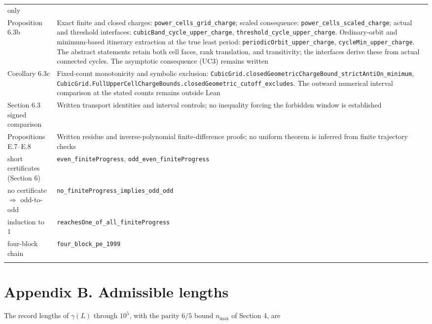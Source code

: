 \documentclass[12pt]{article}
\begin{document}
\begin{longtable}[]{@{}
  >{\raggedright\arraybackslash}p{}
  >{\raggedright\arraybackslash}p{}@{}}
only \\
Proposition 6.3b & Exact finite and closed charges:
\texttt{\nolinkurl{power_cells_grid_charge}}; scaled consequence:
\texttt{\nolinkurl{power_cells_scaled_charge}}; actual and threshold
interfaces: \texttt{\nolinkurl{cubicBand_cycle_upper_charge}},
\texttt{\nolinkurl{threshold_cycle_upper_charge}}. Ordinary-orbit and
minimum-based itinerary extraction at the true least period:
\texttt{\nolinkurl{periodicOrbit_upper_charge}},
\texttt{\nolinkurl{cycleMin_upper_charge}}. The abstract statements
retain both cell faces, rank translation, and transitivity; the
interfaces derive these from actual connected cycles. The asymptotic
consequence (UC3) remains written \\
Corollary 6.3c & Fixed-count monotonicity and symbolic exclusion:
\texttt{\nolinkurl{CubicGrid.closedGeometricChargeBound_strictAntiOn_minimum}},
\texttt{\nolinkurl{CubicGrid.FullUpperCellChargeBounds.closedGeometric_cutoff_excludes}}.
The outward numerical interval comparison at the stated counts remains
outside Lean \\
Section 6.3 signed comparison & Written transport identities and
interval controls; no inequality forcing the forbidden window is
established \\
Propositions E.7--E.8 & Written residue and inverse-polynomial
finite-difference proofs; no uniform theorem is inferred from finite
trajectory checks \\
short certificates (Section 6) &
\texttt{\nolinkurl{even_finiteProgress}},
\texttt{\nolinkurl{odd_even_finiteProgress}} \\
no certificate \(\Rightarrow\) odd-to-odd &
\texttt{\nolinkurl{no_finiteProgress_implies_odd_odd}} \\
induction to \(1\) &
\texttt{\nolinkurl{reachesOne_of_all_finiteProgress}} \\
four-block chain & \texttt{\nolinkurl{four_block_pe_1999}} \\*
\end{longtable}

\endgroup

\section{Appendix B. Admissible
lengths}\label{appendix-b.-admissible-lengths}

The record lengths of \(\gamma(L)\) through \(10^5\), with the parity
\(6/5\) bound \(n_{\max}\) of Section 4, are
\end{document}
